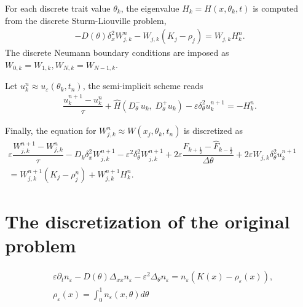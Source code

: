 \documentclass[11pt, dina4, amsfont12]{article}
\begin{document}
For each discrete trait value $\theta_k$, the eigenvalue $H_k = H(x, \theta_k, t)$ is computed from the discrete Sturm-Liouville problem,
\begin{align}
-D(\theta)\delta_x^2W_{j,k}^n-W_{j,k}(K_j - \rho_j)=W_{j,k}H_k^n.
\end{align}
The discrete Neumann boundary conditions are imposed as
$W_{0,k}=W_{1, k}, W_{N,k}=W_{N-1,k}$.

 Let $u_k^n\approx u_\varepsilon(\theta_k, t_n)$, the semi-implicit scheme reads
\begin{align}
\dfrac{u_k^{n+1} - u_k^n}{\tau} +\hat{H} \!\left(D_\theta^- u_k,\; D_\theta^+ u_k\right) - \varepsilon \delta_\theta^2 u_k^{n+1} = -H_k^n.
\end{align}

Finally, the equation for $W_{j,k}^n\approx W(x_j,\theta_k, t_n)$ is discretized as
\begin{equation}
\begin{aligned}
\varepsilon \dfrac{W_{j,k}^{n+1}-W_{j,k}^n}{\tau} - D_k\delta_x^2W_{j,k}^{n+1} - \varepsilon^2 \delta_\theta^2 W_{j,k}^{n+1} + 2\varepsilon \dfrac{\hat{F}_{k+\frac{1}{2}} - \hat{F}_{k-\frac{1}{2}}}{\Delta\theta} + 2\varepsilon W_{j,k}\delta_\theta^2u_k^{n+1} \qquad  \\
= W_{j,k}^{n+1}(K_j-\rho_j^n) + W_{j,k}^{n+1}H_k^n.
\end{aligned}  
\end{equation}

\section{The discretization of the original problem}
\begin{equation}
\begin{aligned}
&\varepsilon \partial_t n_\varepsilon - D(\theta)\Delta_{xx}n_\varepsilon -\varepsilon^2\Delta_\theta n_\varepsilon = n_\varepsilon(K(x) - \rho_\varepsilon (x)),\\
&\rho_\varepsilon(x) = \int_0^1 n_\varepsilon(x,\theta) d\theta 
\end{aligned}
\end{equation}
\end{document}
